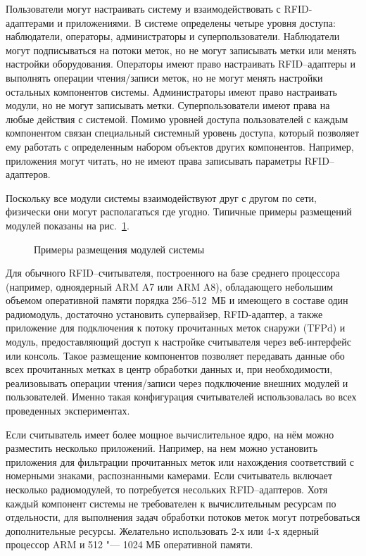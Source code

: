 Пользователи могут настраивать систему и взаимодействовать с RFID-адаптерами и приложениями. В системе определены четыре уровня доступа: наблюдатели, операторы, администраторы и суперпользователи. Наблюдатели могут подписываться на потоки меток, но не могут записывать метки или менять настройки оборудования. Операторы имеют право настраивать RFID--адаптеры и выполнять операции чтения/записи меток, но не могут менять настройки остальных компонентов системы. Администраторы имеют право настраивать модули, но не могут записывать метки. Суперпользователи имеют права на любые действия с системой. Помимо уровней доступа пользователей с каждым компонентом связан специальный системный уровень доступа, который позволяет ему работать с определенным набором объектов других компонентов. Например, приложения могут читать, но не имеют права записывать параметры RFID--адаптеров.

Поскольку все модули системы взаимодействуют друг с другом по сети, физически они могут располагаться где угодно. Типичные примеры размещений модулей показаны на рис.~\ref{fig:ch5_deployments}.

\begin{figure}[ht]
  \caption{Примеры размещения модулей системы}
  \label{fig:ch5_deployments}
\end{figure}

Для обычного RFID--считывателя, построенного на базе среднего процессора (например, одноядерный ARM A7 или ARM A8), обладающего небольшим объемом оперативной памяти порядка 256--512~МБ и имеющего в составе один радиомодуль, достаточно установить супервайзер, RFID-адаптер, а также приложение для подключения к потоку прочитанных меток снаружи (TFPd) и модуль, предоставляющий доступ к настройке считывателя через веб-интерфейс или консоль. Такое размещение компонентов позволяет передавать данные обо всех прочитанных метках в центр обработки данных и, при необходимости, реализовывать операции чтения/записи через подключение внешних модулей и пользователей. Именно такая конфигурация считывателей использовалась во всех проведенных экспериментах.

Если считыватель имеет более мощное вычислительное ядро, на нём можно разместить несколько приложений. Например, на нем можно установить приложения для фильтрации прочитанных меток или нахождения соответствий с номерными знаками, распознанными камерами. Если считыватель включает несколько радиомодулей, то потребуется несольких RFID--адаптеров. Хотя каждый компонент системы не требователен к вычислительным ресурсам по отдельности, для выполнения задач обработки потоков меток могут потребоваться дополнительные ресурсы. Желательно использовать 2-х или 4-х ядерный процессор ARM и 512 "--- 1024 МБ оперативной памяти.

